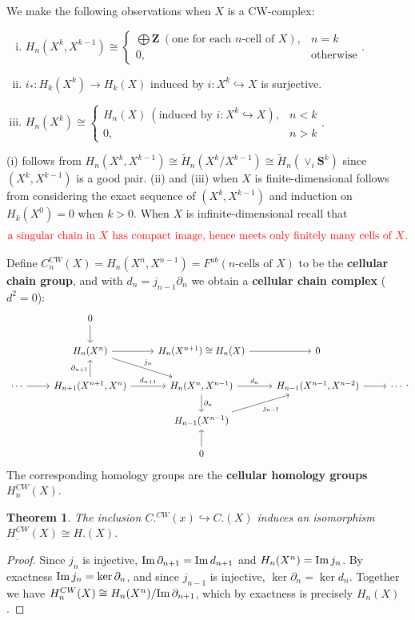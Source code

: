 \documentclass[11pt]{article}
\theoremstyle{definition}
\theoremstyle{plain}
\newtheorem{theorem}{Theorem}[section]
\theoremstyle{remark}
\newcommand{\im}{\textup{Im}\,}
\newcommand{\Z}{\mathbf{Z}}
\begin{document}
We make the following observations when $X$ is a CW-complex:
\begin{enumerate}[(i)]
\item $H_n(X^k,X^{k-1})\cong\begin{cases}\bigoplus\Z\ (\textrm{one for each }n\textrm{-cell of }X),&n=k\\0,&\textrm{otherwise}
\end{cases}$.

\item $i_\ast:H_k(X^k)\to H_k(X)$ induced by $i:X^k\hookrightarrow X$ is surjective.

\item $H_n(X^k)\cong\begin{cases}H_n(X)\ (\textrm{induced by }i:X^k\hookrightarrow X),&n<k\\0,&n>k
\end{cases}$.
\end{enumerate}
(i) follows from $H_n(X^k,X^{k-1})\cong\widetilde{H}_n(X^k/X^{k-1})\cong\widetilde{H}_n(\vee_i\mathbf{S}^k)$ since $(X^k,X^{k-1})$ is a good pair. (ii) and (iii) when $X$ is finite-dimensional follows from considering the exact sequence of $(X^k,X^{k-1})$ and induction on $H_k(X^0)=0$ when $k>0$. When $X$ is infinite-dimensional recall that
\begin{align*}
\textrm{\textcolor{red}{a singular chain in $X$ has compact image, hence meets only finitely many cells of $X$.}}
\end{align*}

Define $C_n^{CW}(X)=H_n(X^n,X^{n-1})=F^{ab}(n\textrm{-cells of }X)$ to be the \textbf{cellular chain group}, and with $d_n=j_{n-1}\partial_n$ we obtain a \textbf{cellular chain complex} ($d^2=0$):
\[\begin{tikzcd}[column sep=small]
&&0\arrow[d]&&&&&&\\
&&H_n(X^n)\arrow[rrd, "j_n"]\arrow[rr]&&H_n(X^{n+1})\cong H_n(X)\arrow[rr]&&0&&\\
\cdots\arrow[rr]&&{H_{n+1}(X^{n+1},X^n)}\arrow[u,"\partial_{n+1}"]\arrow[rr,"d_{n+1}"]&& {H_n(X^n,X^{n-1})}\arrow[rr, "d_n"] \arrow[d, "\partial_n"] &  & {H_{n-1}(X^{n-1},X^{n-2})} \arrow[rr]&&\cdots\\
&&&&H_{n-1}(X^{n-1})\arrow[rru,"j_{n-1}"']&&&&\\
&&&&0\arrow[u]&&&&       
\end{tikzcd}.\]
The corresponding homology groups are the \textbf{cellular homology groups} $H_n^{CW}(X)$.

\begin{theorem}
The inclusion $C.^{CW}(x)\hookrightarrow C.(X)$ induces an isomorphism
$H_.^{CW}(X)\cong H.(X)$.
\end{theorem}
\begin{proof}
Since $j_n$ is injective, $\im\partial_{n+1}=\im d_{n+1}$ and $H_n(X^n)=\im j_n$. By exactness $\im j_n=\ker\partial_n$, and since $j_{n-1}$ is injective, $\ker\partial_n=\ker d_n$. Together we have $H_n^{CW}(X)\cong H_n(X^n)/\im\partial_{n+1}$, which by exactness is precisely $H_n(X)$.
\end{proof}
\end{document}
